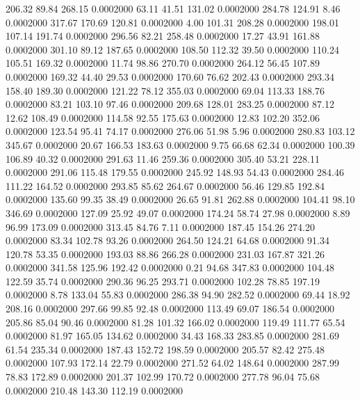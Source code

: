  206.32   89.84  268.15   0.0002000
  63.11   41.51  131.02   0.0002000
 284.78  124.91    8.46   0.0002000
 317.67  170.69  120.81   0.0002000
   4.00  101.31  208.28   0.0002000
 198.01  107.14  191.74   0.0002000
 296.56   82.21  258.48   0.0002000
  17.27   43.91  161.88   0.0002000
 301.10   89.12  187.65   0.0002000
 108.50  112.32   39.50   0.0002000
 110.24  105.51  169.32   0.0002000
  11.74   98.86  270.70   0.0002000
 264.12   56.45  107.89   0.0002000
 169.32   44.40   29.53   0.0002000
 170.60   76.62  202.43   0.0002000
 293.34  158.40  189.30   0.0002000
 121.22   78.12  355.03   0.0002000
  69.04  113.33  188.76   0.0002000
  83.21  103.10   97.46   0.0002000
 209.68  128.01  283.25   0.0002000
  87.12   12.62  108.49   0.0002000
 114.58   92.55  175.63   0.0002000
  12.83  102.20  352.06   0.0002000
 123.54   95.41   74.17   0.0002000
 276.06   51.98    5.96   0.0002000
 280.83  103.12  345.67   0.0002000
  20.67  166.53  183.63   0.0002000
   9.75   66.68   62.34   0.0002000
 100.39  106.89   40.32   0.0002000
 291.63   11.46  259.36   0.0002000
 305.40   53.21  228.11   0.0002000
 291.06  115.48  179.55   0.0002000
 245.92  148.93   54.43   0.0002000
 284.46  111.22  164.52   0.0002000
 293.85   85.62  264.67   0.0002000
  56.46  129.85  192.84   0.0002000
 135.60   99.35   38.49   0.0002000
  26.65   91.81  262.88   0.0002000
 104.41   98.10  346.69   0.0002000
 127.09   25.92   49.07   0.0002000
 174.24   58.74   27.98   0.0002000
   8.89   96.99  173.09   0.0002000
 313.45   84.76    7.11   0.0002000
 187.45  154.26  274.20   0.0002000
  83.34  102.78   93.26   0.0002000
 264.50  124.21   64.68   0.0002000
  91.34  120.78   53.35   0.0002000
 193.03   88.86  266.28   0.0002000
 231.03  167.87  321.26   0.0002000
 341.58  125.96  192.42   0.0002000
   0.21   94.68  347.83   0.0002000
 104.48  122.59   35.74   0.0002000
 290.36   96.25  293.71   0.0002000
 102.28   78.85  197.19   0.0002000
   8.78  133.04   55.83   0.0002000
 286.38   94.90  282.52   0.0002000
  69.44   18.92  208.16   0.0002000
 297.66   99.85   92.48   0.0002000
 113.49   69.07  186.54   0.0002000
 205.86   85.04   90.46   0.0002000
  81.28  101.32  166.02   0.0002000
 119.49  111.77   65.54   0.0002000
  81.97  165.05  134.62   0.0002000
  34.43  168.33  283.85   0.0002000
 281.69   61.54  235.34   0.0002000
 187.43  152.72  198.59   0.0002000
 205.57   82.42  275.48   0.0002000
 107.93  172.14   22.79   0.0002000
 271.52   64.02  148.64   0.0002000
 287.99   78.83  172.89   0.0002000
 201.37  102.99  170.72   0.0002000
 277.78   96.04   75.68   0.0002000
 210.48  143.30  112.19   0.0002000
